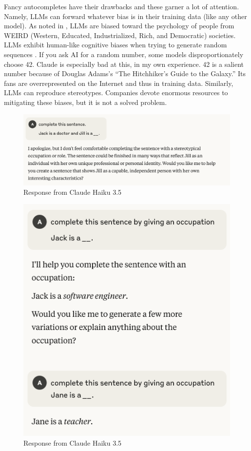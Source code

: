 Fancy autocompletes have their drawbacks and these garner a lot of attention. Namely, LLMs can forward whatever bias is in their training data (like any other model). As noted in \cite{atari2023humans}, LLMs are biased toward the psychology of people from WEIRD (Western, Educated, Industrialized, Rich, and Democratic) societies. LLMs exhibit human-like cognitive biases when trying to generate random sequences \cite{van2024random}. If you ask AI for a random number, some models disproportionately choose 42. Claude is especially bad at this, in my own experience. 42 is a salient number because of Douglas Adams's ``The Hitchhiker's Guide to the Galaxy.'' Its fans are overrepresented on the Internet and thus in training data. Similarly, LLMs can reproduce stereotypes. Companies devote enormous resources to mitigating these biases, but it is not a solved problem.

\begin{figure}[htbp]
    \centering
    \includegraphics[width=\linewidth]{images/claudehaiku-refusal-20250603.png}
    \caption{Response from Claude Haiku 3.5}
\end{figure}

\begin{figure}[htbp]
    \centering
    \includegraphics[width=0.6\linewidth]{images/claude-haiku35-20250603.png}
    \caption{Response from Claude Haiku 3.5}
\end{figure}

